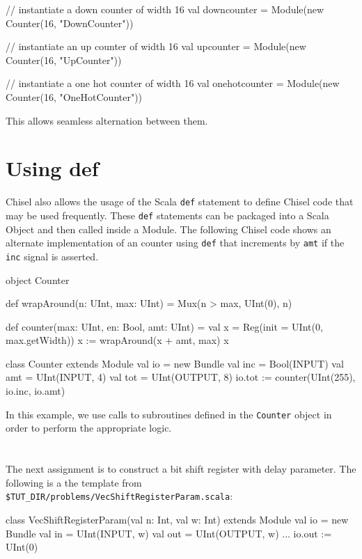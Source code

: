 \begin{scala}
// instantiate a down counter of width 16
val downcounter = 
  Module(new Counter(16, "DownCounter"))

// instantiate an up counter of width 16
val upcounter = 
  Module(new Counter(16, "UpCounter"))

// instantiate a one hot counter of width 16
val onehotcounter = 
  Module(new Counter(16, "OneHotCounter"))
\end{scala}

This allows seamless alternation between them.

\section{Using def}

Chisel also allows the usage of the Scala \verb+def+ statement to define Chisel code that may be used frequently. These \verb+def+ statements can be packaged into a Scala Object and then called inside a Module. The following Chisel code shows an alternate implementation of an counter using \verb+def+ that increments by \verb+amt+ if the \verb+inc+ signal is asserted.

\begin{scala} 
object Counter {
  def wrapAround(n: UInt, max: UInt) = 
    Mux(n > max, UInt(0), n)

  def counter(max: UInt, en: Bool, amt: UInt) = {
    val x = Reg(init = UInt(0, max.getWidth))
    x := wrapAround(x + amt, max)
    x
  }
}

class Counter extends Module {
  val io = new Bundle {
    val inc = Bool(INPUT)
    val amt = UInt(INPUT,  4)
    val tot = UInt(OUTPUT, 8)
  }
  io.tot := counter(UInt(255), io.inc, io.amt)
}
\end{scala}
 
\noindent
In this example, we use calls to subroutines defined in the \verb+Counter+ object in order to perform the appropriate logic. 

\section{}

The next assignment is to construct a bit shift register with delay parameter.
The following is a the template from \verb+$TUT_DIR/problems/VecShiftRegisterParam.scala+:

\begin{scala}
class VecShiftRegisterParam(val n: Int, val w: Int) extends Module {
  val io = new Bundle {
    val in  = UInt(INPUT,  w)
    val out = UInt(OUTPUT, w)
  }
  ...
  io.out := UInt(0)
}
\end{scala}

